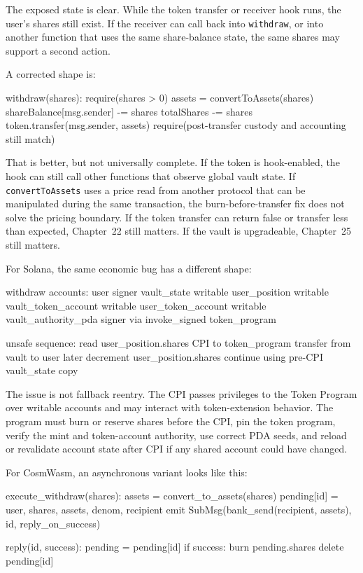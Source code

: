 The exposed state is clear. While the token transfer or receiver hook runs, the user's shares still exist. If the receiver can call back into \texttt{withdraw}, or into another function that uses the same share-balance state, the same shares may support a second action.

A corrected shape is:

\begin{codeblock}
withdraw(shares):
    require(shares > 0)
    assets = convertToAssets(shares)
    shareBalance[msg.sender] -= shares
    totalShares -= shares
    token.transfer(msg.sender, assets)
    require(post-transfer custody and accounting still match)
\end{codeblock}

That is better, but not universally complete. If the token is hook-enabled, the hook can still call other functions that observe global vault state. If \texttt{convertToAssets} uses a price read from another protocol that can be manipulated during the same transaction, the burn-before-transfer fix does not solve the pricing boundary. If the token transfer can return false or transfer less than expected, Chapter~22 still matters. If the vault is upgradeable, Chapter~25 still matters.

For Solana, the same economic bug has a different shape:

\begin{codeblock}
withdraw accounts:
    user signer
    vault_state writable
    user_position writable
    vault_token_account writable
    user_token_account writable
    vault_authority_pda signer via invoke_signed
    token_program

unsafe sequence:
    read user_position.shares
    CPI to token_program transfer from vault to user
    later decrement user_position.shares
    continue using pre-CPI vault_state copy
\end{codeblock}

The issue is not fallback reentry. The CPI passes privileges to the Token Program over writable accounts and may interact with token-extension behavior. The program must burn or reserve shares before the CPI, pin the token program, verify the mint and token-account authority, use correct PDA seeds, and reload or revalidate account state after CPI if any shared account could have changed.

For CosmWasm, an asynchronous variant looks like this:

\begin{codeblock}
execute_withdraw(shares):
    assets = convert_to_assets(shares)
    pending[id] = { user, shares, assets, denom, recipient }
    emit SubMsg(bank_send(recipient, assets), id, reply_on_success)

reply(id, success):
    pending = pending[id]
    if success:
        burn pending.shares
    delete pending[id]
\end{codeblock}

